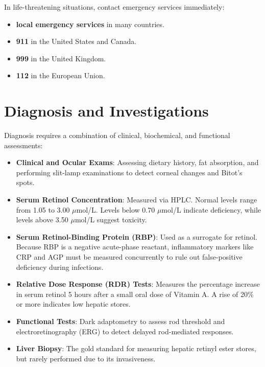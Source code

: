 In life-threatening situations, contact emergency services immediately:
\begin{itemize}
    \item \textbf{local emergency services} in many countries.
    \item \textbf{911} in the United States and Canada.
    \item \textbf{999} in the United Kingdom.
    \item \textbf{112} in the European Union.
\end{itemize}

\section*{Diagnosis and Investigations}
Diagnosis requires a combination of clinical, biochemical, and functional assessments:
\begin{itemize}
    \item \textbf{Clinical and Ocular Exams}: Assessing dietary history, fat absorption, and performing slit-lamp examinations to detect corneal changes and Bitot's spots.
    \item \textbf{Serum Retinol Concentration}: Measured via HPLC. Normal levels range from 1.05 to 3.00 $\mu$mol/L. Levels below 0.70 $\mu$mol/L indicate deficiency, while levels above 3.50 $\mu$mol/L suggest toxicity.
    \item \textbf{Serum Retinol-Binding Protein (RBP)}: Used as a surrogate for retinol. Because RBP is a negative acute-phase reactant, inflammatory markers like CRP and AGP must be measured concurrently to rule out false-positive deficiency during infections.
    \item \textbf{Relative Dose Response (RDR) Tests}: Measures the percentage increase in serum retinol 5 hours after a small oral dose of Vitamin A. A rise of 20\% or more indicates low hepatic stores.
    \item \textbf{Functional Tests}: Dark adaptometry to assess rod threshold and electroretinography (ERG) to detect delayed rod-mediated responses.
    \item \textbf{Liver Biopsy}: The gold standard for measuring hepatic retinyl ester stores, but rarely performed due to its invasiveness.
\end{itemize}

